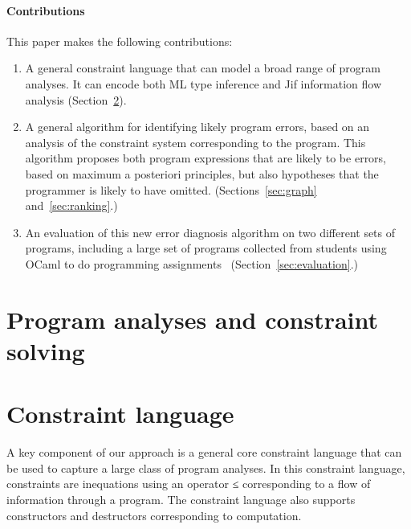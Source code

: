 \paragraph{Contributions}

This paper makes the following contributions:

\begin{enumerate}
\item
A general constraint language that can model a broad
range of program analyses. It can encode both ML type
inference and Jif information flow analysis
(Section~\ref{sec:language}).

\item
A general algorithm for identifying likely program errors,
based on an analysis of the constraint system corresponding
to the program. This algorithm proposes both program expressions
that are likely to be errors, based on maximum a posteriori
principles, but also hypotheses that the programmer is
likely to have omitted.
(Sections~\ref{sec:graph} and~\ref{sec:ranking}.)

\item
An evaluation of this new error diagnosis algorithm on two
different sets of programs, including a large set of programs
collected from students using OCaml to do
programming assignments~\cite{lerner:pldi07}
(Section~\ref{sec:evaluation}.)

\end{enumerate}

\section{Program analyses and constraint solving}


\section{Constraint language}
\label{sec:language}

A key component of our approach is a general core constraint language
that can be used to capture a large class of program analyses.
In this constraint language, constraints are inequations using an
operator ≤ corresponding
to a flow of information through a program. The constraint language
also supports constructors and destructors corresponding to
computation.

